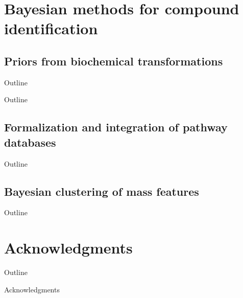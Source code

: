 \documentclass[xcolor=dvipsnames]{beamer}
\begin{document}
\section{Bayesian methods for compound identification}
\subsection{Priors from biochemical transformations}
\begin{frame}{Outline}
	\vspace{-10.5pt}
	\tableofcontents[currentsection,subsectionstyle=hide]
\end{frame}

\begin{frame}{Outline}
	\vspace{-10.5pt}
	\tableofcontents[currentsection,subsectionstyle=show/shaded/hide]
\end{frame}

\subsection{Formalization and integration of pathway databases}
\begin{frame}{Outline}
	\vspace{-10.5pt}
	\tableofcontents[currentsection,subsectionstyle=show/shaded/hide]
\end{frame}

\subsection{Bayesian clustering of mass features}
\begin{frame}{Outline}
	\vspace{-10.5pt}
	\tableofcontents[currentsection,subsectionstyle=show/shaded/hide]
\end{frame}

\section{Acknowledgments}
\begin{frame}{Outline}
	\vspace{-10.5pt}
	\tableofcontents[currentsection,subsectionstyle=hide]
\end{frame}

\begin{frame}{Acknowledgments}
	\vspace{-5.5pt}
	\begin{center}
	\end{center}
\end{frame}
\end{document}
